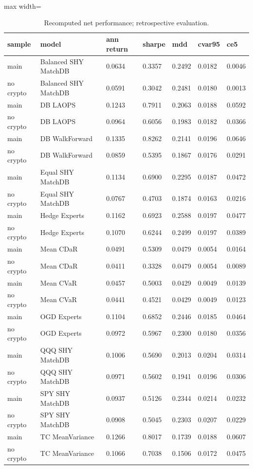 \begin{table}[htbp]
\centering\scriptsize
\caption{Recomputed net performance; retrospective evaluation.}
\begin{adjustbox}{max width=\linewidth}
\begin{tabular}{lllllll}
\hline
sample & model & ann return & sharpe & mdd & cvar95 & ce5 \\
\hline
main & Balanced SHY MatchDB & 0.0634 & 0.3357 & 0.2492 & 0.0182 & 0.0046 \\
no crypto & Balanced SHY MatchDB & 0.0591 & 0.3042 & 0.2481 & 0.0180 & 0.0013 \\
main & DB LAOPS & 0.1243 & 0.7911 & 0.2063 & 0.0188 & 0.0592 \\
no crypto & DB LAOPS & 0.0964 & 0.6056 & 0.1983 & 0.0182 & 0.0366 \\
main & DB WalkForward & 0.1335 & 0.8262 & 0.2141 & 0.0196 & 0.0646 \\
no crypto & DB WalkForward & 0.0859 & 0.5395 & 0.1867 & 0.0176 & 0.0291 \\
main & Equal SHY MatchDB & 0.1134 & 0.6900 & 0.2295 & 0.0187 & 0.0472 \\
no crypto & Equal SHY MatchDB & 0.0767 & 0.4703 & 0.1874 & 0.0163 & 0.0216 \\
main & Hedge Experts & 0.1162 & 0.6923 & 0.2588 & 0.0197 & 0.0477 \\
no crypto & Hedge Experts & 0.1070 & 0.6244 & 0.2499 & 0.0197 & 0.0389 \\
main & Mean CDaR & 0.0491 & 0.5309 & 0.0479 & 0.0054 & 0.0164 \\
no crypto & Mean CDaR & 0.0411 & 0.3328 & 0.0479 & 0.0054 & 0.0089 \\
main & Mean CVaR & 0.0457 & 0.5003 & 0.0429 & 0.0049 & 0.0139 \\
no crypto & Mean CVaR & 0.0441 & 0.4521 & 0.0429 & 0.0049 & 0.0123 \\
main & OGD Experts & 0.1104 & 0.6852 & 0.2446 & 0.0185 & 0.0464 \\
no crypto & OGD Experts & 0.0972 & 0.5967 & 0.2300 & 0.0180 & 0.0356 \\
main & QQQ SHY MatchDB & 0.1006 & 0.5690 & 0.2013 & 0.0204 & 0.0314 \\
no crypto & QQQ SHY MatchDB & 0.0971 & 0.5602 & 0.1941 & 0.0196 & 0.0306 \\
main & SPY SHY MatchDB & 0.0937 & 0.5126 & 0.2344 & 0.0214 & 0.0232 \\
no crypto & SPY SHY MatchDB & 0.0908 & 0.5045 & 0.2303 & 0.0207 & 0.0229 \\
main & TC MeanVariance & 0.1266 & 0.8017 & 0.1739 & 0.0188 & 0.0607 \\
no crypto & TC MeanVariance & 0.1066 & 0.7038 & 0.1506 & 0.0172 & 0.0475 \\
\hline
\end{tabular}
\end{adjustbox}
\end{table}
